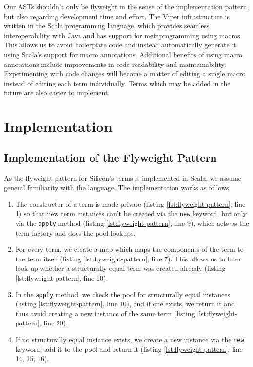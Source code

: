\documentclass[11pt]{article}
\begin{document}
    Our ASTs shouldn't only be flyweight in the sense of the implementation pattern, but also
    regarding development time and effort.
    The Viper infrastructure is written in the Scala programming language, which 
    provides seamless interoperability with Java and has support
    for metaprogramming using macros. \cite{macros} This allows us to avoid boilerplate
    code and instead automatically generate it using Scala's support for macro annotations.
    Additional benefits of using macro annotations include improvements in code
    readability and maintainability. Experimenting with code changes will become a matter
    of editing a single macro instead of editing each term individually.
    Terms which may be added in the future are also easier to implement.

    \newpage
    \section{Implementation}

    \subsection{Implementation of the Flyweight Pattern} \label{implementation-flyweight-pattern}

    As the flyweight pattern for Silicon's terms is implemented in Scala,
    we assume general familiarity with the language. 
    The implementation works as follows:

    \begin{enumerate}
        \item The constructor of a term is made private (listing \ref{lst:flyweight-pattern}, line 1) so that new term instances can't be created via
            the \texttt{new} keyword, but only via the \texttt{apply} method (listing \ref{lst:flyweight-pattern}, line 9), which acts as the
            term factory and does the pool lookups.
        \item For every term, we create a map which maps the components of the term to the term itself (listing \ref{lst:flyweight-pattern}, line 7).
            This allows us to later look up whether a structurally equal term was created already (listing \ref{lst:flyweight-pattern}, line 10).
        \item In the \texttt{apply} method, we check the pool for structurally equal instances (listing \ref{lst:flyweight-pattern}, line 10),
            and if one exists, we return it and thus avoid creating a new instance of the
            same term (listing \ref{lst:flyweight-pattern}, line 20).
        \item If no structurally equal instance exists, we create a new instance via the \texttt{new}
            keyword, add it to the pool and return it (listing \ref{lst:flyweight-pattern}, line 14, 15, 16).
    \end{enumerate}
\end{document}
